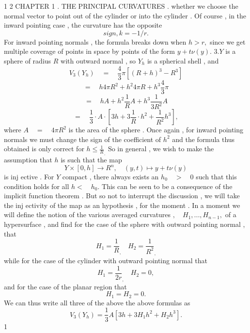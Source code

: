 1 2 \quad CHAPTER 1 . \quad THE PRINCIPAL CURVATURES . \quad whether we choose the normal vector to point out of the cylinder or into the cylinder . \quad Of course , in the inward pointing case , the curvature has the opposite \[ sign  ,   k   =   -  1  /  r  . \]
For inward pointing normals , the formula breaks down when  $ h   >   r  , $  since we get multiple coverage of points in space by points of the form  $ y   +   t  \nu  (  y  )  . $   $ 3  .  Y $  is a sphere of radius  $ R $  with outward normal , so  $ Y _{ h }$  is a spherical shell , and \[ V _{ 3 } (  Y _{ h } )  \quad  =  \quad \frac{ 4 }{ 3 } \pi  [  (  R   +   h  ) ^{ 3 }  -   R ^{ 3 } ] \]
\[ =  \quad  h  4  \pi  R ^{ 2 }  +   h ^{ 2 } 4  \pi  R   +   h ^{ 3 }\frac{ 4 }{ 3 } \pi \]
\[ =  \quad  hA   +   h ^{ 2 }\frac{ 1 }{ R } A   +   h ^{ 3 }\frac{ 1 }{ 3  R ^{ 2 }} A \]
\[ =  \quad \frac{ 1 }{ 3 }  \cdot   A   \cdot   [  3  h   +   3 \frac{ 1 }{ R }  \cdot   h ^{ 2 }  +  \frac{ 1 }{ R ^{ 2 }} h ^{ 3 } ]   , \]
where  $ A  \quad  =  \quad  4  \pi  R ^{ 2 }$  \quad is the area of the sphere \quad . \quad Once again \quad , \quad for inward pointing normals we must change the sign of the coefficient of  $ h ^{ 2 }$  and the formula thus obtained is only correct for  $ h   \leq  \frac{ 1 }{ R }_{ . }$  So in general , we wish to make the assumption that  $ h $  is such that the map \[ Y   \times   [  0  ,   h  ]   \rightarrow   R ^{ n } ,  \quad  (  y  ,   t  )   \mapsto   y   +   t  \nu  (  y  ) \]
is inj \quad ective \quad . \quad For \quad  $ Y $  \quad compact \quad , \quad there \quad always exists \quad an \quad  $ h _{ 0 } \quad  >  \quad  0 $  such that this condition holds for all  $ h   <  \quad  h _{ 0 } . $  \quad This can be seen to be a consequence of the implicit function theorem . \quad But so not to interrupt the discussion , we will take the inj ectivity of the map as an hypothesis , for the moment . In a moment we will define the notion of the various averaged curvatures \quad  $ ,  \quad  H _{ 1 } ,   .  .  .  ,   H _{ n  -  1 } , $  of a hypersurface , \quad and find for the case of the sphere with outward pointing normal , that \[ H _{ 1 }  =  \frac{ 1 }{ R }_{ , } \quad  H _{ 2 }  =  \frac{ 1 }{ R ^{ 2 }}_{ , }\]
while for the case of the cylinder with outward pointing normal that \[ H _{ 1 }  =  \frac{ 1 }{ 2  r }_{ , } \quad  H _{ 2 }  =   0  , \]
and for the case of the planar region that \[ H _{ 1 }  =   H _{ 2 }  =   0  . \]
We can thus write all three of the above the above formulas as \[ V _{ 3 } (  Y _{ h } )   =  \frac{ 1 }{ 3 } A  [  3  h   +   3  H _{ 1 } h ^{ 2 }  +   H _{ 2 } h ^{ 3 } ]  . \]
1 